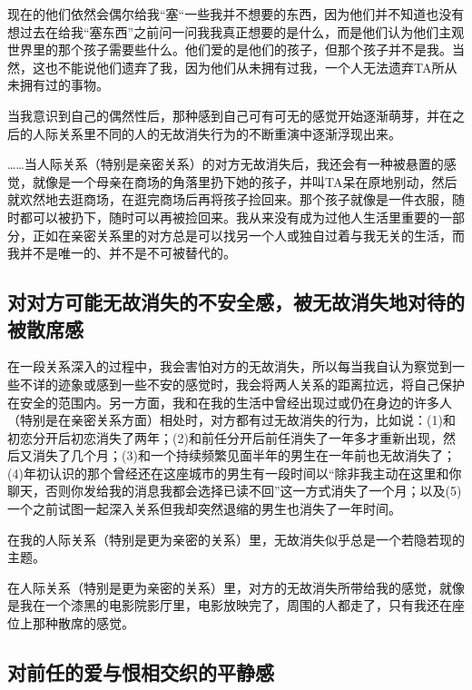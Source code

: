 现在的他们依然会偶尔给我“塞“一些我并不想要的东西，因为他们并不知道也没有想过去在给我“塞东西”之前问一问我我真正想要的是什么，而是他们认为他们主观世界里的那个孩子需要些什么。他们爱的是他们的孩子，但那个孩子并不是我。当然，这也不能说他们遗弃了我，因为他们从未拥有过我，一个人无法遗弃TA所从未拥有过的事物。

当我意识到自己的偶然性后，那种感到自己可有可无的感觉开始逐渐萌芽，并在之后的人际关系里不同的人的无故消失行为的不断重演中逐渐浮现出来。

……当人际关系（特别是亲密关系）的对方无故消失后，我还会有一种被悬置的感觉，就像是一个母亲在商场的角落里扔下她的孩子，并叫TA呆在原地别动，然后就欢然地去逛商场，在逛完商场后再将孩子捡回来。那个孩子就像是一件衣服，随时都可以被扔下，随时可以再被捡回来。我从来没有成为过他人生活里重要的一部分，正如在亲密关系里的对方总是可以找另一个人或独自过着与我无关的生活，而我并不是唯一的、并不是不可被替代的。


\subsection*{对对方可能无故消失的不安全感，被无故消失地对待的被散席感}

在一段关系深入的过程中，我会害怕对方的无故消失，所以每当我自认为察觉到一些不详的迹象或感到一些不安的感觉时，我会将两人关系的距离拉远，将自己保护在安全的范围内。另一方面，我和在我的生活中曾经出现过或仍在身边的许多人（特别是在亲密关系方面）相处时，对方都有过无故消失的行为，比如说：(1)和初恋分开后初恋消失了两年；(2)和前任分开后前任消失了一年多才重新出现，然后又消失了几个月；(3)和一个持续频繁见面半年的男生在一年前也无故消失了；(4)年初认识的那个曾经还在这座城市的男生有一段时间以“除非我主动在这里和你聊天，否则你发给我的消息我都会选择已读不回”这一方式消失了一个月；以及(5)一个之前试图一起深入关系但我却突然退缩的男生也消失了一年时间。

在我的人际关系（特别是更为亲密的关系）里，无故消失似乎总是一个若隐若现的主题。

在人际关系（特别是更为亲密的关系）里，对方的无故消失所带给我的感觉，就像是我在一个漆黑的电影院影厅里，电影放映完了，周围的人都走了，只有我还在座位上\pozhehao{}那种散席的感觉。


\subsection*{对前任的爱与恨相交织的平静感}

